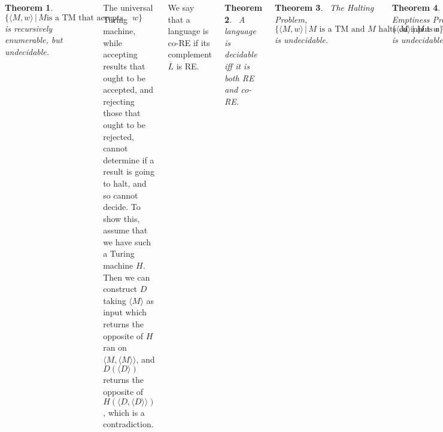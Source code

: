 \documentclass{tikzposter} %
\newtheorem{theorem}{Theorem}
\begin{document}
\begin{columns}
{{        \begin{theorem}
        \ $\{\langle M, w \rangle \,|\, M \text{is a TM that accepts input } w\}$ is recursively enumerable, but undecidable.
        \end{theorem}
        \hphantom{}

        The universal Turing machine, while accepting results that ought to be accepted, and rejecting those that ought to be rejected, cannot determine if a result is going to halt, and so cannot decide. To show this, assume that we have such a Turing machine $H$. Then we can construct $D$ taking $\langle M \rangle $ as input which returns the opposite of $H$ ran on $\langle M, \langle M \rangle \rangle$, and $D(\langle D \rangle)$ returns the opposite of $H(\langle D, \langle D \rangle \rangle) $, which is a contradiction.
      }
      \hphantom{}

      We say that a language is co-RE if its complement $\overline{L}$ is RE. \\

      \begin{theorem}
      \ A language is decidable iff it is both RE and co-RE.
      \end{theorem}
      \hphantom{}

      \begin{theorem}
      \ The Halting Problem, $\{ \langle M, w \rangle \,|\, M  \text{ is a TM and } M \text{ halts on input } w\}$ is undecidable.
      \end{theorem}
      \hphantom{}

      \begin{theorem}
      \ The Emptiness Problem, $\{ \langle M \rangle \,|\, M \text{ is a TM and } L(M) = \varnothing\}$ is undecidable.
      \end{theorem}
      \hphantom{}

      \begin{theorem}
      \ The Equivalence Problem, $\{ \langle M_{1}, M_{2} \rangle \,|\, M_{1} \text{ and } M_{2} \text{ are TMs and } L(M_{1}) = L(M_{2})\}$ is undecidable.
      \end{theorem}
      \hphantom{}

      \begin{theorem}
      \ $\{\langle M \rangle \,|\, M \text{ halts on all inputs }\}$ is neither RE nor co-RE.
      \end{theorem}
      \hphantom{}

      \begin{theorem}[Rice's theorem]
        \ Every non-trivial property of the RE sets is undecidable. That is, for a proper non-trivial $S \subset RE$, a decision problem $P = \{ \langle M \rangle \,|\, L(M) \in S\}$ is undecidable.
      \end{theorem}
      \hphantom{}

}
\end{columns}
\end{document}
